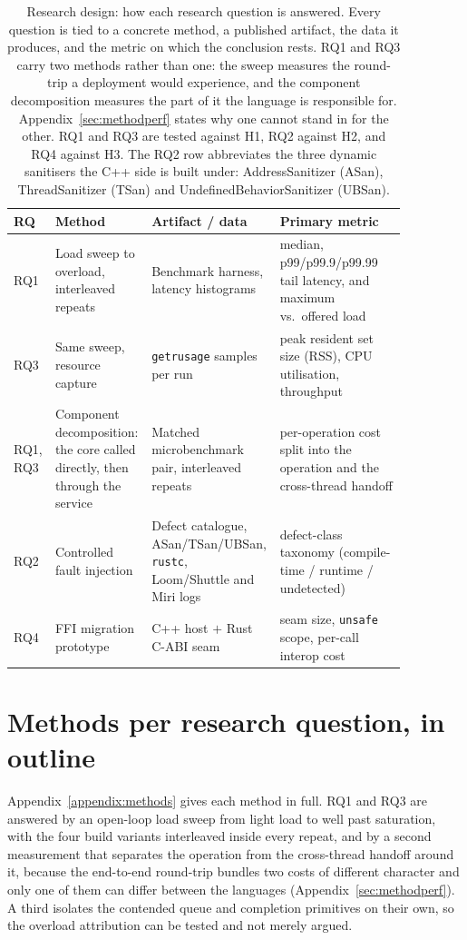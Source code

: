\documentclass[english,oneside,a4paper,censored,csm,software-track-2020]{HYthesisML}
\renewcommand{\arraystretch}{0.95}
\begin{document}
\begin{table}[H]
\centering
\caption[Research design: how each research question is answered]{Research design: how each research question is answered. Every question is tied to a
concrete method, a published artifact, the data it produces, and the metric on which the
conclusion rests. RQ1 and RQ3 carry two methods rather than one: the sweep measures the
round-trip a deployment would experience, and the component decomposition measures the part of
it the language is responsible for. Appendix~\ref{sec:methodperf} states why one cannot stand in
for the other. RQ1 and RQ3 are tested against H1, RQ2 against H2, and RQ4 against H3. The RQ2 row
abbreviates the three dynamic sanitisers the C++ side is built under: AddressSanitizer (ASan),
ThreadSanitizer (TSan) and UndefinedBehaviorSanitizer
(UBSan).\label{tab:design}}
\renewcommand{\arraystretch}{1.25}
\begin{tabular}{@{}p{0.06\linewidth} p{0.24\linewidth} p{0.24\linewidth} p{0.32\linewidth}@{}}
\hline\hline
RQ & Method & Artifact / data & Primary metric \\
\hline
RQ1 & Load sweep to overload, interleaved repeats & Benchmark harness, latency histograms &
median, p99/p99.9/p99.99 tail latency, and maximum vs.\ offered load \\
RQ3 & Same sweep, resource capture & \texttt{getrusage} samples per run &
peak resident set size (RSS), CPU utilisation, throughput \\
RQ1, RQ3 & Component decomposition: the core called directly, then through the service &
Matched microbenchmark pair, interleaved repeats &
per-operation cost split into the operation and the cross-thread handoff \\
RQ2 & Controlled fault injection & Defect catalogue, ASan/TSan/UBSan, \texttt{rustc},
Loom/Shuttle and Miri logs &
defect-class taxonomy (compile-time / runtime / undetected) \\
RQ4 & FFI migration prototype & C++ host $+$ Rust C-ABI seam &
seam size, \texttt{unsafe} scope, per-call interop cost \\
\hline
\end{tabular}
\end{table}

\section{Methods per research question, in outline}
Appendix~\ref{appendix:methods} gives each method in full. RQ1 and RQ3 are answered by an
open-loop load sweep from light load to well past saturation, with the four build variants
interleaved inside every repeat, and by a second measurement that separates the operation from
the cross-thread handoff around it, because the end-to-end round-trip bundles two costs of
different character and only one of them can differ between the languages
(Appendix~\ref{sec:methodperf}). A third isolates the contended queue and completion primitives
on their own, so the overload attribution can be tested and not merely argued.
\end{document}
